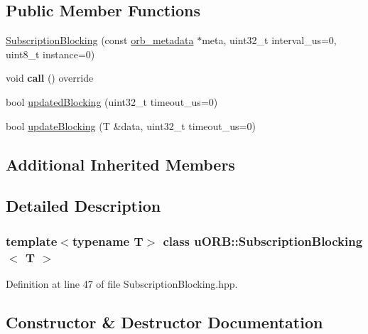 \subsection*{Public Member Functions}
\begin{DoxyCompactItemize}
\item 
\hyperlink{classuORB_1_1SubscriptionBlocking_a112e322e269b8d7c577f1dde3b5e8393}{Subscription\+Blocking} (const \hyperlink{structorb__metadata}{orb\+\_\+metadata} $\ast$meta, uint32\+\_\+t interval\+\_\+us=0, uint8\+\_\+t instance=0)
\item 
\mbox{\label{classuORB_1_1SubscriptionBlocking_ab151303fb1a35645cc86570031991a58}} 
void {\bfseries call} () override
\item 
bool \hyperlink{classuORB_1_1SubscriptionBlocking_af6a2f560b911949ed11eabc0cfad7874}{updated\+Blocking} (uint32\+\_\+t timeout\+\_\+us=0)
\item 
bool \hyperlink{classuORB_1_1SubscriptionBlocking_ab1e6e657ca5ebbaf53fde6204109350d}{update\+Blocking} (T \&data, uint32\+\_\+t timeout\+\_\+us=0)
\end{DoxyCompactItemize}
\subsection*{Additional Inherited Members}


\subsection{Detailed Description}
\subsubsection*{template$<$typename T$>$\newline
class u\+O\+R\+B\+::\+Subscription\+Blocking$<$ T $>$}



Definition at line 47 of file Subscription\+Blocking.\+hpp.



\subsection{Constructor \& Destructor Documentation}
\mbox{\label{classuORB_1_1SubscriptionBlocking_a112e322e269b8d7c577f1dde3b5e8393}} 

